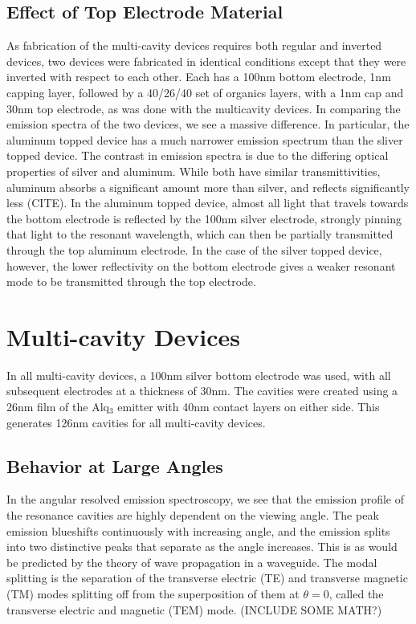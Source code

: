 \documentclass{report}
\begin{document}
        \subsection{Effect of Top Electrode Material}
            As fabrication of the multi-cavity devices requires both regular and inverted devices, two devices were fabricated in identical conditions except that they were inverted with respect to each other. Each has a 100nm bottom electrode, 1nm capping layer, followed by a 40/26/40 set of organics layers, with a 1nm cap and 30nm top electrode, as was done with the multicavity devices. In comparing the emission spectra of the two devices, we see a massive difference. In particular, the aluminum topped device has a much narrower emission spectrum than the sliver topped device. The contrast in emission spectra is due to the differing optical properties of silver and aluminum. While both have similar transmittivities, aluminum absorbs a significant amount more than silver, and reflects significantly less (CITE). In the aluminum topped device, almost all light that travels towards the bottom electrode is reflected by the 100nm silver electrode, strongly pinning that light to the resonant wavelength, which can then be partially transmitted through the top aluminum electrode. In the case of the silver topped device, however, the lower reflectivity on the bottom electrode gives a weaker resonant mode to be transmitted through the top electrode.

    \section{Multi-cavity Devices}
        In all multi-cavity devices, a 100nm silver bottom electrode was used, with all subsequent electrodes at a thickness of 30nm. The cavities were created using a 26nm film of the Alq$_3$ emitter with 40nm contact layers on either side. This generates 126nm cavities for all multi-cavity devices.
    
        \subsection{Behavior at Large Angles}
		In the angular resolved emission spectroscopy, we see that the emission profile of the resonance cavities are highly dependent on the viewing angle. The peak emission blueshifts continuously with increasing angle, and the emission splits into two distinctive peaks that separate as the angle increases. This is as would be predicted by the theory of wave propagation in a waveguide. The modal splitting is the separation of the transverse electric (TE) and transverse magnetic (TM) modes splitting off from the superposition of them at $\theta=0$, called the transverse electric and magnetic (TEM) mode. (INCLUDE SOME MATH?)
    
\end{document}
